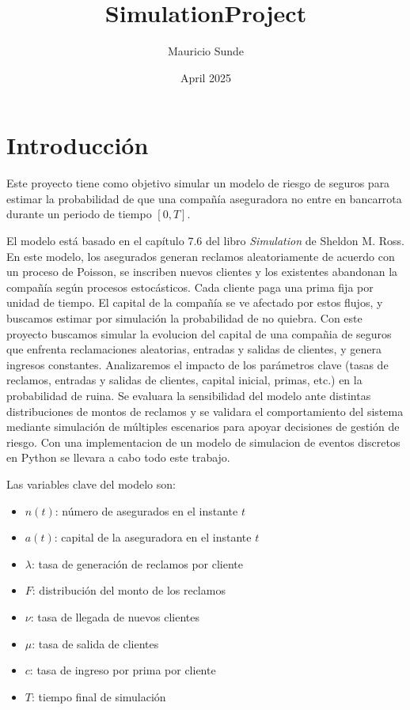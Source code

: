 \documentclass{article}
\title{SimulationProject}
\author{Mauricio Sunde}
\date{April 2025}
\begin{document}
\maketitle

\section{Introducción}

Este proyecto tiene como objetivo simular un modelo de riesgo de seguros para estimar la probabilidad de que una compañía aseguradora no entre en bancarrota durante un periodo de tiempo $[0, T]$.

El modelo está basado en el capítulo 7.6 del libro \textit{Simulation} de Sheldon M. Ross. En este modelo, los asegurados generan reclamos aleatoriamente de acuerdo con un proceso de Poisson, se inscriben nuevos clientes y los existentes abandonan la compañía según procesos estocásticos. Cada cliente paga una prima fija por unidad de tiempo. El capital de la compañía se ve afectado por estos flujos, y buscamos estimar por simulación la probabilidad de no quiebra. Con este proyecto buscamos simular la evolucion del capital de una compañia de seguros que enfrenta reclamaciones aleatorias, entradas y salidas de clientes, y genera ingresos constantes. Analizaremos el impacto de los parámetros clave (tasas de reclamos, entradas y salidas de clientes, capital inicial, primas, etc.) en la probabilidad de ruina. Se evaluara la sensibilidad del modelo ante distintas distribuciones de montos de reclamos y se validara el comportamiento del sistema mediante simulación de múltiples escenarios para apoyar decisiones de gestión de riesgo. Con una implementacion de un modelo de simulacion de eventos discretos en Python se llevara a cabo todo este trabajo.

Las variables clave del modelo son:

\begin{itemize}
    \item $n(t)$: número de asegurados en el instante $t$
    \item $a(t)$: capital de la aseguradora en el instante $t$
    \item $\lambda$: tasa de generación de reclamos por cliente
    \item $F$: distribución del monto de los reclamos
    \item $\nu$: tasa de llegada de nuevos clientes
    \item $\mu$: tasa de salida de clientes
    \item $c$: tasa de ingreso por prima por cliente
    \item $T$: tiempo final de simulación
\end{itemize}
\end{document}
